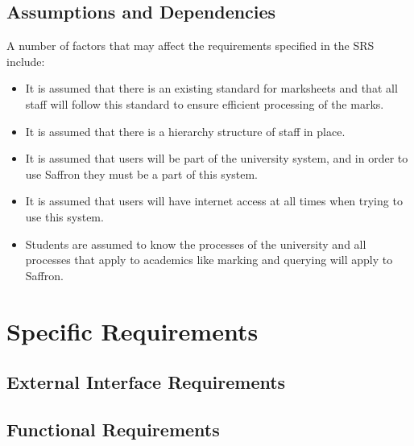 \documentclass[a4paper,12pt]{article}
\begin{document}
        \subsection{Assumptions and Dependencies}
        A number of factors that may affect the requirements specified in the SRS include:
        \begin{itemize}
        	\item It is assumed that there is an existing standard for marksheets and that all staff will follow this standard to ensure efficient processing of the marks.
        	\item It is assumed that there is a hierarchy structure of staff in place.
        	\item It is assumed that users will be part of the university system, and in order to use Saffron they must be a part of this system.
        	\item It is assumed that users will have internet access at all times when trying to use this system.
        	\item Students are assumed to know the processes of the university and all processes that apply to academics like marking and querying will apply to Saffron.
        	
        \end{itemize}
    \section{Specific Requirements}
    
    	\subsection{External Interface Requirements}
    	
        \subsection{Functional Requirements}
\end{document}
